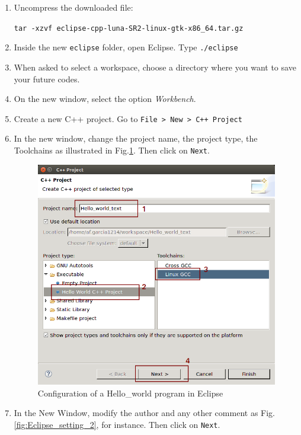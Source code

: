 \documentclass[12pt, oneside]{book}              %
\begin{document}
\begin{enumerate}
\item Uncompress the downloaded file:

\texttt{tar -xzvf eclipse-cpp-luna-SR2-linux-gtk-x86\_64.tar.gz}

\item Inside the new \texttt{eclipse} folder, open Eclipse. Type \texttt{./eclipse}

\item When asked to select a workspace, choose a directory where you want to save your
future codes.

\item On the new window, select the option \textit{Workbench}.

\item Create a new C++ project. Go to \texttt{File > New > C++ Project}

\item In the new window, change the project name, the project type, the Toolchains as
illustrated in Fig.\ref{fig:Eclipse_setting_project}. Then click on \texttt{Next}.

\begin{figure}[h!]
\centering
\includegraphics[width=0.6\linewidth]{./Imags_Doc/Eclipse_setting_project}
\caption[Configuration of a Hello\_world program in Eclipse]{Configuration of a Hello\_world program in Eclipse}
\label{fig:Eclipse_setting_project}
\end{figure}

\item In the New Window, modify the author and any other comment as Fig. \ref{fig:Eclipse_setting_2},
for instance. Then click on \texttt{Next}.


\end{enumerate}
\end{document}
